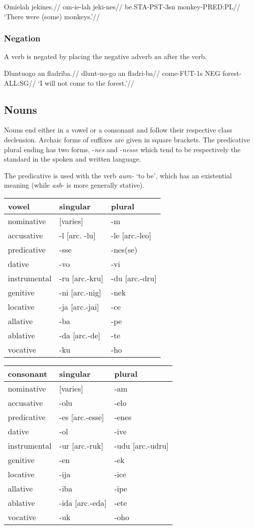 \documentclass[a4paper,]{article}
\begin{document}
\ex \begingl \glpreamble Omielah jekines.// \gla om-ie-lah jeki-nes//
\glb be.STA-PST-3sn monkey-PRED:PL// \glft `There were (some)
monkeys.'// \endgl \xe

\hypertarget{negation}{%
\subsubsection{Negation}\label{negation}}

A verb is negated by placing the negative adverb \emph{an} after the
verb.

\ex \begingl \glpreamble Dluntuogo an fladriba.// \gla dlunt-uo-go an
fladri-ba// \glb come-FUT-1s NEG forest-ALL:SG// \glft `I will not come
to the forest.'// \endgl \xe

\hypertarget{nouns}{%
\subsection{Nouns}\label{nouns}}

Nouns end either in a vowel or a consonant and follow their respective
class declension. Archaic forms of suffixes are given in square
brackets. The predicative plural ending has two forms, -\emph{nes} and
-\emph{nesse} which tend to be respectively the standard in the spoken
and written language.

The predicative is used with the verb \emph{aum-} `to be', which has an
existential meaning (while \emph{ash}- is more generally stative).

\begin{longtable}[]{@{}lll@{}}
\toprule
vowel & singular & plural\tabularnewline
\midrule
\endhead
nominative & {[}varies{]} & -m\tabularnewline
accusative & -l {[}arc. -lu{]} & -le {[}arc.-leo{]}\tabularnewline
predicative & -sse & -nes(se)\tabularnewline
dative & -vo & -vi\tabularnewline
instrumental & -ru {[}arc.-kru{]} & -du {[}arc.-dru{]}\tabularnewline
genitive & -ni {[}arc.-nig{]} & -nek\tabularnewline
locative & -ja {[}arc.-jai{]} & -ce\tabularnewline
allative & -ba & -pe\tabularnewline
ablative & -da {[}arc.-de{]} & -te\tabularnewline
vocative & -ku & -ho\tabularnewline
\bottomrule
\end{longtable}

\begin{longtable}[]{@{}lll@{}}
\toprule
consonant & singular & plural\tabularnewline
\midrule
\endhead
nominative & {[}varies{]} & -am\tabularnewline
accusative & -olu & -elo\tabularnewline
predicative & -es {[}arc.-esse{]} & -enes\tabularnewline
dative & -ol & -ive\tabularnewline
instrumental & -ur {[}arc.-ruk{]} & -udu {[}arc.-udru{]}\tabularnewline
genitive & -en & -ek\tabularnewline
locative & -ija & -ice\tabularnewline
allative & -iba & -ipe\tabularnewline
ablative & -ida {[}arc.-eda{]} & -ete\tabularnewline
vocative & -uk & -oho\tabularnewline
\bottomrule
\end{longtable}
\end{document}
